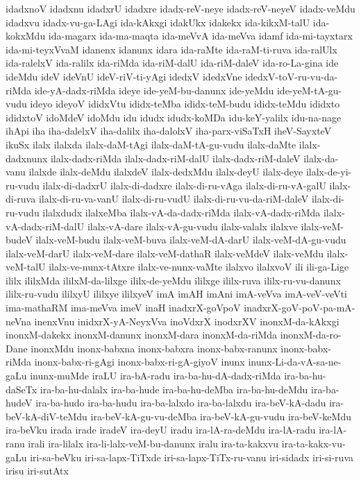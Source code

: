 {idadxnoV
idadxnu
idadxrU
idadxre
idadx-reV-neye
idadx-reV-neyeV
idadx-veMdu
idadxvu
idadx-vu-ga-LAgi
ida-kAkxgi
idakUkx
idakekx
ida-kikxM-talU
ida-kokxMdu
ida-magarx
ida-ma-maqta
ida-meVvA
ida-meVva
idamf
ida-mi-tayxtarx
ida-mi-teyxVvaM
idanenx
idanunx
idara
ida-raMte
ida-raM-ti-ruva
ida-ralUlx
ida-ralelxV
ida-ralilx
ida-riMda
ida-riM-dalU
ida-riM-daleV
ida-ro-La-gina
ide
ideMdu
ideV
ideVnU
ideV-riV-ti-yAgi
idedxV
idedxVne
idedxV-toV-ru-vu-da-riMda
ide-yA-dadx-riMda
ideye
ide-yeM-bu-danunx
ide-yeMdu
ide-yeM-tA-gu-vudu
ideyo
ideyoV
ididxVtu
ididx-teMba
ididx-teM-budu
ididx-teMdu
ididxto
ididxtoV
idoMdeV
idoMdu
idu
idudx
idudx-koMDa
idu-keY-yalilx
idu-na-nage
ihApi
iha
iha-dalelxV
iha-dalilx
iha-dalolxV
iha-parx-viSaTxH
iheV-SayxteV
ikuSx
ilalx
ilalxda
ilalx-daM-tAgi
ilalx-daM-tA-gu-vudu
ilalx-daMte
ilalx-dadxnunx
ilalx-dadx-riMda
ilalx-dadx-riM-dalU
ilalx-dadx-riM-daleV
ilalx-da-vanu
ilalxde
ilalx-deMdu
ilalxdeV
ilalx-dedxMdu
ilalx-deyU
ilalx-deye
ilalx-de-yi-ru-vudu
ilalx-di-dadxrU
ilalx-di-dadxre
ilalx-di-ru-vAga
ilalx-di-ru-vA-galU
ilalx-di-ruva
ilalx-di-ru-va-vanU
ilalx-di-ru-vudU
ilalx-di-ru-vu-da-riM-daleV
ilalx-di-ru-vudu
ilalxdudx
ilalxeMba
ilalx-vA-da-dadx-riMda
ilalx-vA-dadx-riMda
ilalx-vA-dadx-riM-dalU
ilalx-vA-dare
ilalx-vA-gu-vudu
ilalx-valalx
ilalxve
ilalx-veM-budeV
ilalx-veM-budu
ilalx-veM-buva
ilalx-veM-dA-darU
ilalx-veM-dA-gu-vudu
ilalx-veM-darU
ilalx-veM-dare
ilalx-veM-dathaR
ilalx-veMdeV
ilalx-veMdu
ilalx-veM-talU
ilalx-ve-nunx-tAtxre
ilalx-ve-nunx-vaMte
ilalxvo
ilalxvoV
ili
ili-ga-Lige
ililx
ililxMda
ililxM-da-lilxge
ililx-de-yeMdu
ililxge
ililx-ruva
ililx-ru-vu-danunx
ililx-ru-vudu
ililxyU
ililxye
ililxyeV
imA
imAH
imAni
imA-veVva
imA-veV-veVti
ima-mathaRM
ima-meVva
imeV
inaH
inadxrX-goVpoV
inadxrX-goV-poV-pa-mA-neVna
inenxVnu
inidxrX-yA-NeyxVva
inoVdxrX
inodxrXV
inonxM-da-kAkxgi
inonxM-dakekx
inonxM-danunx
inonxM-dara
inonxM-da-riMda
inonxM-da-ro-Dane
inonxMdu
inonx-babxna
inonx-babxra
inonx-babx-ranunx
inonx-babx-riMda
inonx-babx-ri-gAgi
inonx-babx-ri-gA-giyoV
inunx
inunx-Li-da-vA-sa-ne-gaLu
inunx-muMde
iraLU
ira-bA-radu
ira-ba-hu-dA-dadx-riMda
ira-ba-hu-daSeTx
ira-ba-hu-dalalx
ira-ba-hude
ira-ba-hu-deMba
ira-ba-hu-deMdu
ira-ba-hudeV
ira-ba-hudo
ira-ba-hudu
ira-ba-lalxdo
ira-ba-lalxdu
ira-beV-kA-dadu
ira-beV-kA-diV-teMdu
ira-beV-kA-gu-vu-deMba
ira-beV-kA-gu-vudu
ira-beV-keMdu
ira-beVku
irada
irade
iradeV
ira-deyU
iradu
ira-lA-ra-deMdu
ira-lA-radu
ira-lA-ranu
irali
ira-lilalx
ira-li-lalx-veM-bu-danunx
iralu
ira-ta-kakxvu
ira-ta-kakx-vu-gaLu
iri-sa-beVku
iri-sa-lapx-TiTxde
iri-sa-lapx-TiTx-ru-vanu
iri-sidadx
iri-si-ruva
irisu
iri-sutAtx
}
